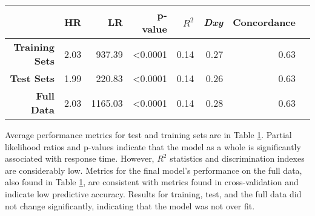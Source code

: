 \documentclass[]{interact}\usepackage[]{graphicx}\usepackage[]{color}
\begin{document}
{%
\begin{table}[!htbp]
{}
{\begin{tabular}{|r|r|r|r|r|r|r|r|}
  \hline
 & \textbf{HR} & \textbf{LR} & \textbf{p-value} & \textbf{$R^2$} & \textbf{\textit{Dxy}} & \textbf{Concordance} \\ 
  \hline
  \textbf{Training Sets} & 2.03 & 937.39  & \textless0.0001 & 0.14 & 0.27 & 0.63 \\ 
  \textbf{Test Sets}     & 1.99 & 220.83  & \textless0.0001 & 0.14 & 0.26 & 0.63 \\
  \textbf{Full Data}     & 2.03 & 1165.03 & \textless0.0001 & 0.14 & 0.28 & 0.63 \\ 
   \hline
\end{tabular}}
\label{table:3}
\end{table}

Average performance metrics for test and training sets are in Table \ref{table:3}. Partial likelihood ratios and p-values indicate that the model as a whole is significantly associated with response time. However, $R^2$ statistics and discrimination indexes are considerably low. Metrics for the final model's performance on the full data, also found in Table \ref{table:3}, are consistent with metrics found in cross-validation and indicate low predictive accuracy. Results for training, test, and the full data did not change significantly, indicating that the model was not over fit. 

}
\end{document}
